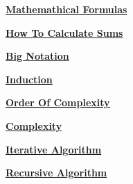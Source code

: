 \documentclass[fleqn]{article}
\begin{document}
\renewcommand{\arrayrulewidth}{0.75mm} %
\setlength{\tabcolsep}{12pt} %
\renewcommand{\arraystretch}{1.5} %

\begin{center}
    \Huge{\textbf{\underline{Mathemathical Formulas}}}
\end{center}

\vspace{0.65cm}


\newpage
\begin{center}
    \Huge{\textbf{\underline{How To Calculate Sums}}}
\end{center}

\vspace{0.65cm}


\newpage
\begin{center}
    \Huge{\textbf{\underline{Big Notation}}}
\end{center}



\vspace{1.5cm}
\begin{center}
    \Huge{\textbf{\underline{Induction}}}
\end{center}




\vspace{1.5cm}
\begin{center}
    \Huge{\textbf{\underline{Order Of Complexity}}}
\end{center}




\vspace{1cm}

\begin{center}
    \Huge{\textbf{\underline{Complexity}}}
\end{center}

\vspace{0.6cm}



\newpage

\begin{center}
    \Huge{\textbf{\underline{Iterative Algorithm}}}
\end{center}

\vspace{0.6cm}



\newpage

\begin{center}
    \Huge{\textbf{\underline{Recursive Algorithm}}}
\end{center}



\end{document}
